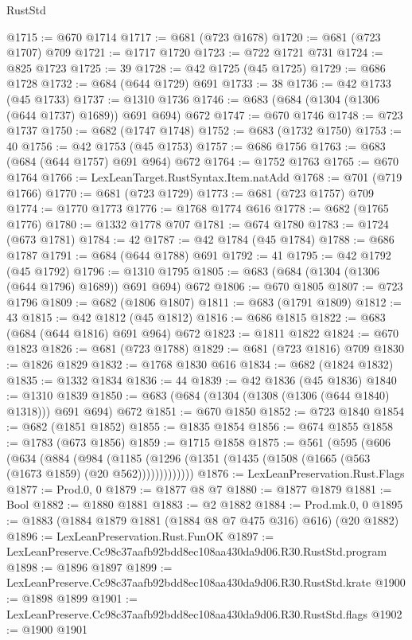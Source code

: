\begin{lexlean}{RustStd}
\begin{coremodule}
@1715 := @670 @1714
@1717 := @681 (@723 @1678)
@1720 := @681 (@723 @1707) @709
@1721 := @1717 @1720
@1723 := @722 @1721 @731
@1724 := @825 @1723
@1725 := 39
@1728 := @42 @1725 (@45 @1725)
@1729 := @686 @1728
@1732 := @684 (@644 @1729) @691
@1733 := 38
@1736 := @42 @1733 (@45 @1733)
@1737 := @1310 @1736
@1746 := @683 (@684 (@1304 (@1306 (@644 @1737) @1689)) @691 @694) @672
@1747 := @670 @1746
@1748 := @723 @1737
@1750 := @682 (@1747 @1748)
@1752 := @683 (@1732 @1750)
@1753 := 40
@1756 := @42 @1753 (@45 @1753)
@1757 := @686 @1756
@1763 := @683 (@684 (@644 @1757) @691 @964) @672
@1764 := @1752 @1763
@1765 := @670 @1764
@1766 := LexLeanTarget.RustSyntax.Item.natAdd
@1768 := @701 (@719 @1766)
@1770 := @681 (@723 @1729)
@1773 := @681 (@723 @1757) @709
@1774 := @1770 @1773
@1776 := @1768 @1774 @616
@1778 := @682 (@1765 @1776)
@1780 := @1332 @1778 @707
@1781 := @674 @1780
@1783 := @1724 (@673 @1781)
@1784 := 42
@1787 := @42 @1784 (@45 @1784)
@1788 := @686 @1787
@1791 := @684 (@644 @1788) @691
@1792 := 41
@1795 := @42 @1792 (@45 @1792)
@1796 := @1310 @1795
@1805 := @683 (@684 (@1304 (@1306 (@644 @1796) @1689)) @691 @694) @672
@1806 := @670 @1805
@1807 := @723 @1796
@1809 := @682 (@1806 @1807)
@1811 := @683 (@1791 @1809)
@1812 := 43
@1815 := @42 @1812 (@45 @1812)
@1816 := @686 @1815
@1822 := @683 (@684 (@644 @1816) @691 @964) @672
@1823 := @1811 @1822
@1824 := @670 @1823
@1826 := @681 (@723 @1788)
@1829 := @681 (@723 @1816) @709
@1830 := @1826 @1829
@1832 := @1768 @1830 @616
@1834 := @682 (@1824 @1832)
@1835 := @1332 @1834
@1836 := 44
@1839 := @42 @1836 (@45 @1836)
@1840 := @1310 @1839
@1850 := @683 (@684 (@1304 (@1308 (@1306 (@644 @1840) @1318))) @691 @694) @672
@1851 := @670 @1850
@1852 := @723 @1840
@1854 := @682 (@1851 @1852)
@1855 := @1835 @1854
@1856 := @674 @1855
@1858 := @1783 (@673 @1856)
@1859 := @1715 @1858
@1875 := @561
    (@595
      (@606
        (@634
          (@884
            (@984
              (@1185 (@1296 (@1351 (@1435 (@1508 (@1665 (@563 (@1673 @1859) (@20 @562)))))))))))))
@1876 := LexLeanPreservation.Rust.Flags
@1877 := Prod.{0, 0}
@1879 := @1877 @8 @7
@1880 := @1877 @1879
@1881 := Bool
@1882 := @1880 @1881
@1883 := @2 @1882
@1884 := Prod.mk.{0, 0}
@1895 := @1883 (@1884 @1879 @1881 (@1884 @8 @7 @475 @316) @616) (@20 @1882)
@1896 := LexLeanPreservation.Rust.FunOK
@1897 := LexLeanPreserve.Cc98c37aafb92bdd8ec108aa430da9d06.R30.RustStd.program
@1898 := @1896 @1897
@1899 := LexLeanPreserve.Cc98c37aafb92bdd8ec108aa430da9d06.R30.RustStd.krate
@1900 := @1898 @1899
@1901 := LexLeanPreserve.Cc98c37aafb92bdd8ec108aa430da9d06.R30.RustStd.flags
@1902 := @1900 @1901

\end{coremodule}
\end{lexlean}
